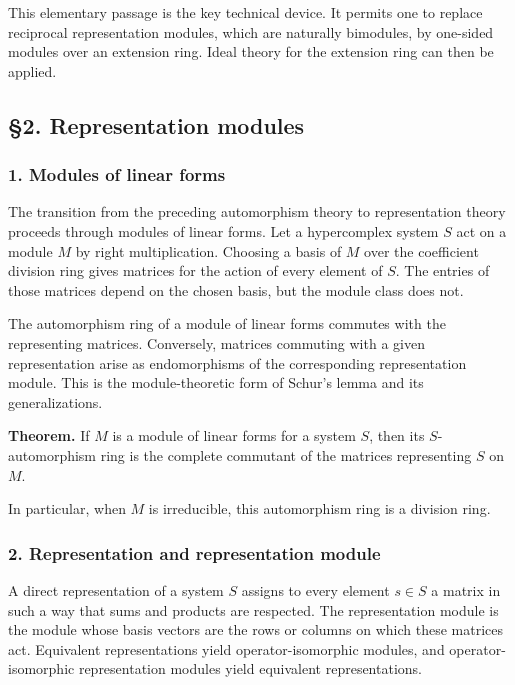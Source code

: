 \documentclass[
  11pt,
]{article}
\begin{document}
This elementary passage is the key technical device. It permits one to
replace reciprocal representation modules, which are naturally
bimodules, by one-sided modules over an extension ring. Ideal theory for
the extension ring can then be applied.

\subsection{§2. Representation modules}\label{representation-modules}

\subsubsection{1. Modules of linear
forms}\label{modules-of-linear-forms}

The transition from the preceding automorphism theory to representation
theory proceeds through modules of linear forms. Let a hypercomplex
system \(S\) act on a module \(M\) by right multiplication. Choosing a
basis of \(M\) over the coefficient division ring gives matrices for the
action of every element of \(S\). The entries of those matrices depend
on the chosen basis, but the module class does not.

The automorphism ring of a module of linear forms commutes with the
representing matrices. Conversely, matrices commuting with a given
representation arise as endomorphisms of the corresponding
representation module. This is the module-theoretic form of Schur's
lemma and its generalizations.

\textbf{Theorem.} If \(M\) is a module of linear forms for a system
\(S\), then its \(S\)-automorphism ring is the complete commutant of the
matrices representing \(S\) on \(M\).

In particular, when \(M\) is irreducible, this automorphism ring is a
division ring.

\subsubsection{2. Representation and representation
module}\label{representation-and-representation-module}

A direct representation of a system \(S\) assigns to every element
\(s\in S\) a matrix in such a way that sums and products are respected.
The representation module is the module whose basis vectors are the rows
or columns on which these matrices act. Equivalent representations yield
operator-isomorphic modules, and operator-isomorphic representation
modules yield equivalent representations.
\end{document}
